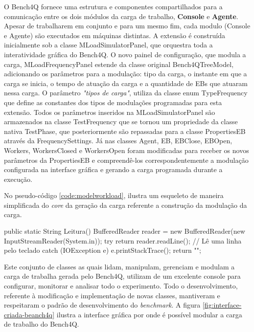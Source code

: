 O Bench4Q fornece uma estrutura e componentes compartilhados para a comunicação entre os dois módulos da carga de trabalho, \textbf{Console} e \textbf{Agente}. Apesar de trabalharem em conjunto e para um mesmo fim, cada modulo (Console e Agente) são executados em máquinas distintas.  A extensão é construída inicialmente sob a classe \textsf{MLoadSimulatorPanel}, que orquestra toda a interatividade gráfica do Bench4Q. O novo painel de configuração, que modula a carga, \textsf{MLoadFrequencyPanel} estende da classe original \textsf{Bench4QTreeModel}, adicionando os parâmetros para a modulação: tipo da carga, o instante em que a carga se inicia, o tempo de atuação da carga e a quantidade de EBs que atuaram nessa carga. O parâmetro \textit{"tipos de carga"}, utiliza da classe enum \textsf{TypeFrequency} que define as constantes dos tipos de modulações programadas para esta extensão.  Todos os parâmetros inseridos na \textsf{MLoadSimulatorPanel} são armazenados na classe \textsf{TestFrequency} que se tornou um propriedade da classe nativa \textsf{TestPhase}, que posteriormente são repassadas para a classe \textsf{PropertiesEB} através da \textsf{FrequencySettings}. Já nas classes \textsf{Agent}, \textsf{EB}, \textsf{EBClose}, \textsf{EBOpen}, \textsf{Workers}, \textsf{WorkersClosed} e \textsf{WorkersOpen} foram modificadas para receber os novos parâmetros da \textsf{PropertiesEB} e compreendê-los correspondentemente a modulação configurada na interface gráfica e gerando a carga programada durante a execução.

No pseudo-código \ref{code:modelworkload}, ilustra um esqueleto de maneira simplificada do \textit{core} da geração da carga referente a construção da modulação da carga.

\begin{codigo}[caption={Algoritmo da extensão para geração e modulação da carga}, label={code:modelworkload}, language=Java, breaklines=true]
	public static String Leitura(){
		BufferedReader reader = new BufferedReader(new InputStreamReader(System.in));
		try {
			return reader.readLine(); // Lê uma linha pelo teclado
		} catch (IOException e) {
		e.printStackTrace();
		return "";
	}
}
\end{codigo}


Este conjunto de classes as quais lidam, manipulam, gerenciam e modulam a carga de trabalha gerada pelo Bench4Q, utilizam de um excelente console para configurar, monitorar e analisar todo o experimento. Todo o desenvolvimento, referente à modificação e implementação de novas classes, mantiveram e respeitaram o padrão de desenvolvimento do \textit{benchmark}. A figura \ref{fig:interface-criada-beanch4q} ilustra a interface gráfica por onde é possível modular a carga de trabalho do Bench4Q. 

